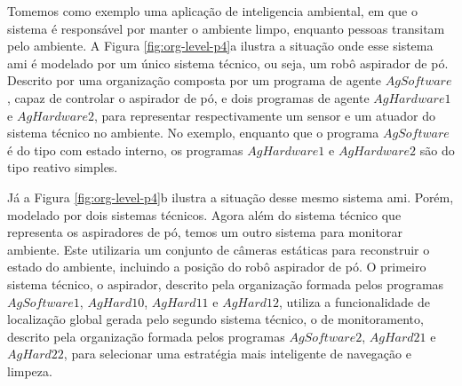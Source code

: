     \begin{figure}[h!]
        \centering
    \end{figure}
    
    Tomemos como exemplo uma aplicação de inteligencia ambiental, em que o sistema é responsável por manter o ambiente limpo, enquanto pessoas transitam pelo ambiente. A Figura \ref{fig:org-level-p4}a ilustra a situação onde esse sistema \acrshort{ami} é modelado por um único sistema técnico, ou seja, um robô aspirador de pó. Descrito por uma organização composta por um programa de agente $AgSoftware$, capaz de controlar o aspirador de pó, e dois programas de agente $AgHardware1$ e $AgHardware2$, para representar respectivamente um sensor e um atuador do sistema técnico no ambiente. No exemplo, enquanto que o programa $AgSoftware$ é do tipo com estado interno, os programas $AgHardware1$ e $AgHardware2$ são do tipo reativo simples.
    
    Já a Figura \ref{fig:org-level-p4}b ilustra a situação desse mesmo sistema \acrshort{ami}. Porém, modelado por dois sistemas técnicos. Agora além do sistema técnico que representa os aspiradores de pó, temos um outro sistema para monitorar ambiente. Este utilizaria um conjunto de câmeras estáticas para reconstruir o estado do ambiente, incluindo a posição do robô aspirador de pó. O primeiro sistema técnico, o aspirador, descrito pela organização formada pelos programas $AgSoftware1$, $AgHard10$, $AgHard11$ e $AgHard12$, utiliza a funcionalidade de localização global gerada pelo segundo sistema técnico, o de monitoramento, descrito pela organização formada pelos programas $AgSoftware2$, $AgHard21$ e $AgHard22$, para selecionar uma estratégia mais inteligente de navegação e limpeza.
    
